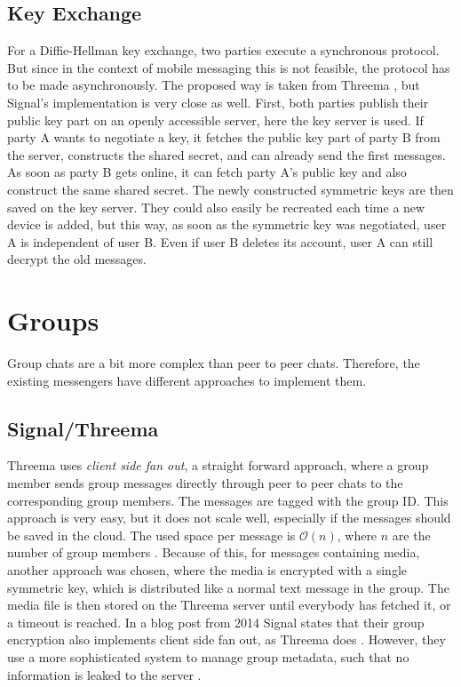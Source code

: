 \documentclass[a4paper, oneside]{discothesis}
\begin{document}
\subsection{Key Exchange}

For a Diffie-Hellman key exchange, two parties execute a synchronous protocol. But since in the context of mobile messaging this is not feasible, the protocol has to be made asynchronously. The proposed way is taken from Threema \cite{Threema}, but Signal's implementation is very close as well. First, both parties publish their public key part on an openly accessible server, here the key server is used. If party A wants to negotiate a key, it fetches the public key part of party B from the server, constructs the shared secret, and can already send the first messages. As soon as party B gets online, it can fetch party A's public key and also construct the same shared secret. The newly constructed symmetric keys are then saved on the key server. They could also easily be recreated each time a new device is added, but this way, as soon as the symmetric key was negotiated, user A is independent of user B. Even if user B deletes its account, user A can still decrypt the old messages.

\section{Groups}

Group chats are a bit more complex than peer to peer chats. Therefore, the existing messengers have different approaches to implement them.

\subsection{Signal/Threema}

Threema uses \emph{client side fan out}, a straight forward approach, where a group member sends group messages directly through peer to peer chats to the corresponding group members. The messages are tagged with the group ID. This approach is very easy, but it does not scale well, especially if the messages should be saved in the cloud. The used space per message is $\mathcal{O}(n)$, where $n$ are the number of group members \cite{Threema}. Because of this, for messages containing media, another approach was chosen, where the media is encrypted with a single symmetric key, which is distributed like a normal text message in the group. The media file is then stored on the Threema server until everybody has fetched it, or a timeout is reached.
In a blog post from 2014 Signal states that their group encryption also implements client side fan out, as Threema does \cite{SignalGroupsOld}. However, they use a more sophisticated system to manage group metadata, such that no information is leaked to the server \cite{SignalGroupsNew}.
\end{document}

